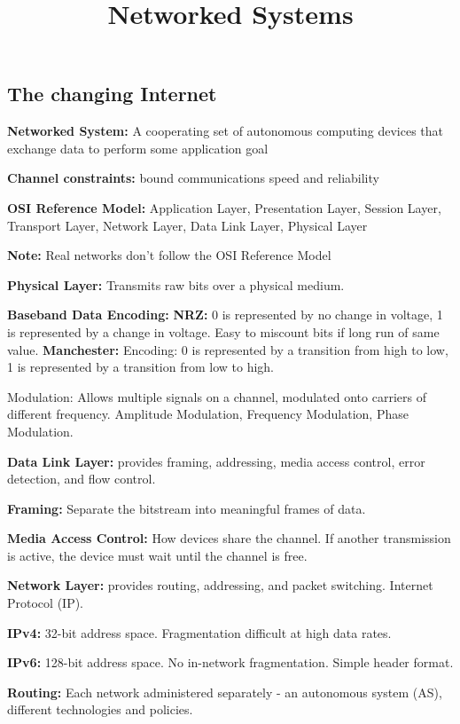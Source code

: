 \documentclass{article}
\title{Networked Systems}
\author{}
\date{}
\begin{document}
\footnotesize

\subsection*{The changing Internet}

\noindent \textbf{Networked System:} A cooperating set of autonomous computing devices that exchange data to perform some application goal

\noindent \textbf{Channel constraints:} bound communications speed and reliability

\noindent \textbf{OSI Reference Model:} Application Layer, Presentation Layer, Session Layer, Transport Layer, Network Layer, Data Link Layer, Physical Layer

\noindent \textbf{Note:} Real networks don't follow the OSI Reference Model

\noindent \textbf{Physical Layer:} Transmits raw bits over a physical medium. 

\noindent \textbf{Baseband Data Encoding:}
\noindent \textbf{NRZ:} 0 is represented by no change in voltage, 1 is represented by a change in voltage. Easy to miscount bits if long run of same value.
\noindent \textbf{Manchester:} Encoding: 0 is represented by a transition from high to low, 1 is represented by a transition from low to high.

\noindent Modulation: Allows multiple signals on a channel, modulated onto carriers of different frequency. Amplitude Modulation, Frequency Modulation, Phase Modulation.

\noindent \textbf{Data Link Layer:} provides framing, addressing, media access control, error detection, and flow control.

\noindent \textbf{Framing:} Separate the bitstream into meaningful frames of data.

\noindent \textbf{Media Access Control:} How devices share the channel. If another transmission is active, the device must wait until the channel is free.


\noindent \textbf{Network Layer:} provides routing, addressing, and packet switching. Internet Protocol (IP).

\noindent \textbf{IPv4:} 32-bit address space. Fragmentation difficult at high data rates.

\noindent \textbf{IPv6:} 128-bit address space. No in-network fragmentation. Simple header format.

\noindent \textbf{Routing:} Each network administered separately - an autonomous system (AS), different technologies and policies.
\end{document}

